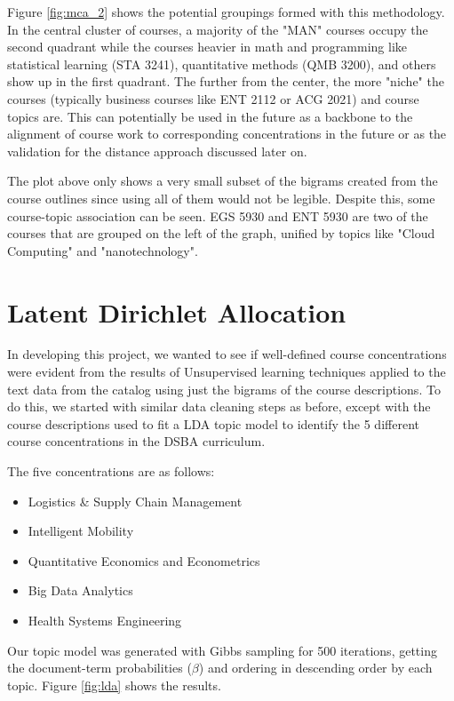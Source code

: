 Figure \ref{fig:mca_2} shows the potential groupings formed with this methodology.  In the central cluster of courses, a majority of the "MAN" courses occupy 
the second quadrant while the courses heavier in math and programming like statistical learning (STA 3241),  quantitative methods (QMB 3200), and others show 
up in the first quadrant.  The further from the center, the more "niche" the courses (typically business courses like ENT 2112 or ACG 2021) and course topics are.  
This can potentially be used in the future as a backbone to the alignment of course work to corresponding concentrations in the future or as the validation for the 
distance approach discussed later on. 

The plot above only shows a very small subset of the bigrams created from the course outlines since using all of them would not be legible.  Despite this,  
some course-topic association can be seen. EGS 5930 and ENT 5930 are two of the courses that are grouped on the left of the graph, unified by topics like "Cloud Computing" and 
"nanotechnology". 

\section{Latent Dirichlet Allocation}

In developing this project, we wanted to see if well-defined course concentrations were evident from the results of Unsupervised learning techniques applied 
to the text data from the catalog using just the bigrams of the course descriptions.  To do this,  we started with similar data cleaning steps as before, except 
with the course descriptions used to fit a LDA \cite{lda_pap} topic model to identify the 5 different course concentrations in the DSBA curriculum. 

The five concentrations are as follows:   
\begin{itemize}
	\item{Logistics \& Supply Chain Management }
	\item{Intelligent Mobility}
	\item{Quantitative Economics and Econometrics}
	\item{Big Data Analytics}
	\item{Health Systems Engineering}

\end{itemize}

Our topic model was generated with Gibbs sampling for 500 iterations,  getting the document-term probabilities ($\beta$) and ordering in descending order by 
each topic. Figure \ref{fig:lda} shows the results.


